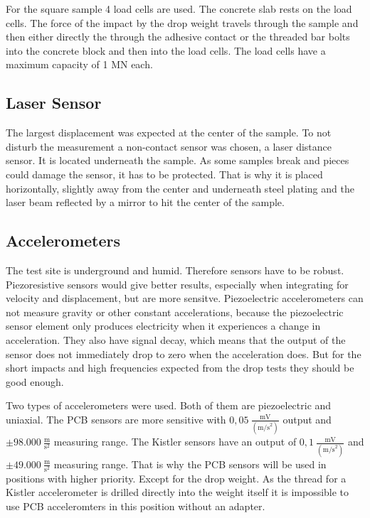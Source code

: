 For the square sample 4 load cells are used. The concrete slab rests on the load cells. The force of the impact by the drop weight travels through the sample and then either directly the through the adhesive contact or the threaded bar bolts into the concrete block and then into the load cells. The load cells have a maximum capacity of 1 MN each.

\subsection{Laser Sensor}
\label{ssec:laser}

The largest displacement was expected at the center of the sample. To not disturb the measurement a non-contact sensor was chosen, a laser distance sensor. 
It is located underneath the sample. As some samples break and pieces could damage the sensor, it has to be protected. That is why it is placed horizontally, slightly away from the center and underneath steel plating and the laser beam reflected by a mirror to hit the center of the sample.

\subsection{Accelerometers}

The test site is underground and humid. Therefore sensors have to be robust. Piezoresistive sensors would give better results, especially when integrating for velocity and displacement, but are more sensitve. Piezoelectric accelerometers can not measure gravity or other constant accelerations, because the piezoelectric sensor element only produces electricity when it experiences a change in acceleration. %
They also have signal decay, which means that the output of the sensor does not immediately drop to zero when the acceleration does. But for the short impacts and high frequencies expected from the drop tests they should be good enough. \autocite{Hanly16} %

Two types of accelerometers were used. 
Both of them are piezoelectric and uniaxial. 
The PCB sensors are more sensitive with \(0,05~\frac{\text{mV}}{(\text{m/s}^2)}\) output and \(\pm 98.000~\frac{\text{m}}{\text{s}^2}\) measuring range.
The Kistler sensors have an output of \(0,1~\frac{\text{mV}}{(\text{m/s}^2)}\) and \(\pm 49.000~\frac{\text{m}}{\text{s}^2}\) measuring range. 
That is why the PCB sensors will be used in positions with higher priority. Except for the drop weight. 
As the thread for a Kistler accelerometer is drilled directly into the weight itself it is impossible to use PCB acceleromters in this position without an adapter.

